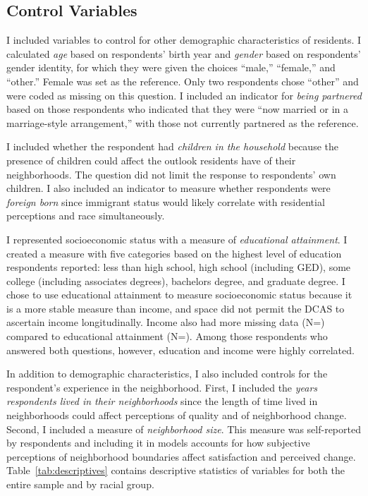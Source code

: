\documentclass{baderart}
\begin{document}
\subsection{Control Variables}\label{control-variables}

I included variables to control for other demographic characteristics of residents. I calculated \emph{age} based on respondents' birth year and \emph{gender} based on respondents' gender identity, for which they were given the choices ``male,'' ``female,'' and ``other.'' Female was set as the reference. Only two respondents chose ``other'' and were coded as missing on this question. I included an indicator for \emph{being partnered} based on those respondents who indicated that they were ``now married or in a marriage-style arrangement,'' with those not currently partnered as the reference.

I included whether the respondent had \emph{children in the household} because the presence of children could affect the outlook residents have of their neighborhoods. The question did not limit the response to respondents' own children. I also included an indicator to measure whether respondents were \emph{foreign born} since immigrant status would likely correlate with residential perceptions and race simultaneously.

I represented socioeconomic status with a measure of \emph{educational attainment}. I created a measure with five categories based on the highest level of education respondents reported: less than high school, high school (including GED), some college (including associates degrees), bachelors degree, and graduate degree. I chose to use educational attainment to measure socioeconomic status because it is a more stable measure than income, and space did not permit the DCAS to ascertain income longitudinally. Income also had more missing data  (N=\miinc) compared to educational attainment (N=\miedu). Among those respondents who answered both questions, however, education and income were highly correlated.

In addition to demographic characteristics, I also included controls for the respondent's experience in the neighborhood. First, I included the \emph{years respondents lived in their neighborhoods} since the length of time lived in neighborhoods could affect perceptions of quality and of neighborhood change. Second, I included a measure of \emph{neighborhood size}. This measure was self-reported by respondents and including it in models accounts for how subjective perceptions of neighborhood boundaries affect satisfaction and perceived change. Table~\ref{tab:descriptives} contains descriptive statistics of variables for both the entire sample and by racial group. 
\end{document}
